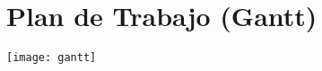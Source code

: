 \section{Plan de Trabajo (Gantt)}
\begin{center}
    \vspace{-4mm}
    \texttt{[image: gantt]}
\end{center}



